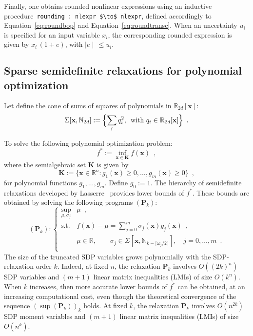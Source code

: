 \documentclass[a4paper,10pt]{article}
\newcommand{\R}{\mathbb{R}}
\newcommand{\N}{\mathbb{N}}
\newcommand{\x}{\mathbf{x}}
\def\P{\mathbf{P}}
\def\K{\mathbf{K}}
\theoremstyle{plain}
\theoremstyle{definition}
\theoremstyle{remark}
\begin{document}
Finally, one obtains rounded nonlinear expressions using an inductive procedure~\lstinline|rounding : nlexpr $\to$ nlexpr|, defined accordingly to Equation~\eqref{eq:roundbop} and Equation~\eqref{eq:roundtransc}. When an uncertainty $u_i$ is specified for an input variable $x_i$, the corresponding rounded expression is given by $x_i \, (1 + e)$, with $\mid e \mid \, \leq u_i$.

\subsection{Sparse semidefinite relaxations for polynomial optimization}
\label{sec:sdpbackground}
Let define the cone of sums of squares of polynomials in $\R_{2 d}[\x]$:
\begin{equation}
\label{eq:cone_sos}
\Sigma [\x, \N_{2d}] := \Bigl\{\sum_i q_i^2, \, \text{ with } q_i \in \R_{2 d}[\x] \Bigr\}\enspace.
\end{equation}

To solve the following polynomial optimization problem:
\begin{equation}
\label{eq:densesos}
f^*  :=  \inf_{\x \in \K} f (\x)\enspace,
\end{equation}
where the semialgebraic set $\K$ is given by
\[\K := \{ \x \in \R^{n} : g_1 (\x) \geq 0, \dots, g_m (\x) \geq 0\}\enspace,\]
for polynomial functions $g_1, \dots, g_m$. Define $g_0 := 1$.
%
The hierarchy of semidefinite relaxations developed by Lasserre~\cite{Lasserre01moments} provides lower bounds of $f^*$. These bounds are obtained by solving the following programs $(\P_k)$:
\[
(\P_k):\left\{			
\begin{array}{ll}
\sup_{\mu, \sigma_j} & \mu\enspace, \\			 
\text{s.t.} & f (\x) - \mu = \sum\limits_{j = 0}^{m} \sigma_j(\x) g_j(\x)\enspace, \\
& \mu\in \R,\qquad \sigma_j \in \Sigma[\x, \N_{k - \lceil \omega_j / 2 \rceil }], \quad j = 0,\dots,m \enspace.\\
\end{array} \right.
\]
%
The size of the truncated SDP variables
grows polynomially with the SDP-relaxation order $k$.
Indeed, at fixed $n$, the relaxation $\P_k$ involves $O((2k)^{n})$ SDP
variables and $(m + 1)$ linear matrix inequalities (LMIs) of size
$O(k^{n})$. When  $k$ increases, then more accurate lower bounds of $f^*$ can be obtained, 
at an increasing computational cost, even though the theoretical convergence 
of the sequence $(\sup (\P_k))_{k}$ holds. At fixed $k$,  the relaxation $\P_k$ involves $O(n^{2k})$ SDP
moment variables and $(m + 1)$ linear matrix inequalities (LMIs) of size
$O(n^{k})$.
\end{document}
